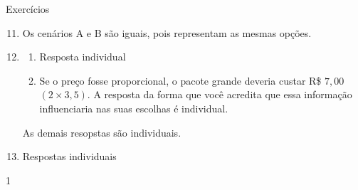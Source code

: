 \clearpage
\begin{resposta}{Exercícios}
{
  \begin{enumerate}\setcounter{enumi}{10}
    \item Os cenários A e B são iguais, pois representam as mesmas opções.
    \item
    \begin{enumerate}
      \item Resposta individual
      \item Se o preço fosse proporcional, o pacote grande deveria custar R\$ $7{,}00$ $(2\times3{,}5)$. A resposta da forma que você acredita que essa informação influenciaria nas suas escolhas é individual.
    \end{enumerate}
    As demais resopstas são individuais.
    \item Respostas individuais
  \end{enumerate}
}{1}
\end{resposta}
